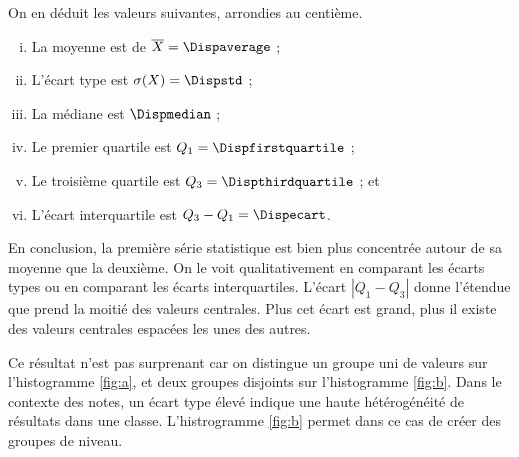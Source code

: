 {	On en déduit les valeurs suivantes, arrondies au centième.
	\begin{enumerate}[i)]
		\item La moyenne est de $\overline{X} = \Dispaverage$ ;
		\item L'écart type est $\sigma(X) = \Dispstd$ ;
		\item La médiane est $\Dispmedian$ ;
		\item Le premier quartile est $Q_1 = \Dispfirstquartile$ ;
		\item Le troisième quartile est $Q_3 = \Dispthirdquartile$ ; et
		\item L'écart interquartile est $Q_3 - Q_1 = \Dispecart$.
	\end{enumerate}


	En conclusion, la première série statistique est bien plus concentrée autour de sa moyenne que la deuxième.
	On le voit qualitativement en comparant les écarts types ou en comparant les écarts interquartiles.
	L'écart $|Q_1 - Q_3|$ donne l'étendue que prend la moitié des valeurs centrales. 
	Plus cet écart est grand, plus il existe des valeurs centrales espacées les unes des autres.
	
	Ce résultat n'est pas surprenant car on distingue un groupe uni de valeurs sur l'histogramme \ref{fig:a}, et deux groupes disjoints sur l'histogramme \ref{fig:b}.
	Dans le contexte des notes, un écart type élevé indique une haute hétérogénéité de résultats dans une classe. 
	L'histrogramme \ref{fig:b} permet dans ce cas de créer des groupes de niveau.
}


